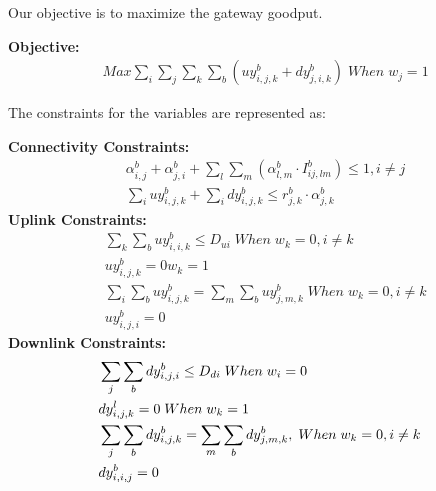 Our objective is to maximize the gateway goodput.

\noindent
{\bf Objective:}
\begin{align}
& Max \sum_i\sum_j\sum_k\sum_b(uy_{i,j,k}^b+dy_{j,i,k}^b) \; When \; w_j=1
\end{align}

The constraints for the variables are represented as:  

\noindent
{\bf Connectivity Constraints:}
\begin{align}
\label{opt:1}
& \alpha_{i,j}^b + \alpha_{j,i}^b + \sum_l\sum_m(\alpha_{l,m}^b \cdot I_{ij,lm}^b) \leq 1, i\neq j \\
\label{opt:2}
& \sum_i uy_{i,j,k}^b + \sum_i dy_{i,j,k}^b \leq r_{j,k}^b \cdot \alpha_{j,k}^b 
\end{align}
\noindent
{\bf Uplink Constraints:} 
\begin{align}
\label{opt:3}
& \sum_k \sum_b uy_{i,i,k}^b \leq D_{ui} \; When \; w_k=0, i \neq k \\
\label{opt:4}
& uy_{i,j,k}^b = 0 w_k=1 \\
\label{opt:6}
& \sum_i\sum_b uy_{i,j,k}^b = \sum_m \sum_b uy_{j,m,k}^b \; When \; w_k=0, i \neq k\\
\label{opt:7}
& uy_{i,j,i}^b=0 
\end{align}
\noindent
{\bf Downlink Constraints:} 
\begin{align}
{\bf}
\label{opt:8}
& \sum_j \sum_b dy_{i,j,i}^b \leq D_{di} \; When \; w_i=0 \\
\label{opt:9}
& dy_{i,j,k}^l =0 \; When \; w_k=1 \\
\label{opt:11}
& \sum_j\sum_b dy_{i,j,k}^b = \sum_m \sum_b dy_{j,m,k}^b,\; When \; w_k=0,  i \neq k \\
\label{opt:12}
& dy_{i,i,j}^b=0
\end{align}


